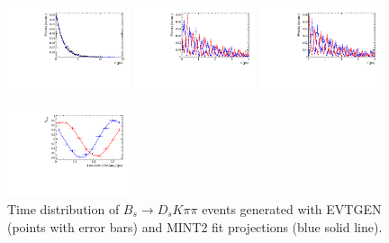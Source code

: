 \clearpage
\begin{figure}[h]
	\centering
		\includegraphics[width=0.32\textwidth, height = !]{figs/timeFit/signal_DsKpipi_CPV_MC/h_t.pdf} 
		\includegraphics[width=0.32\textwidth, height = !]{figs/timeFit/signal_DsKpipi_CPV_MC/h_t_mixed_m.pdf} 	
		\includegraphics[width=0.32\textwidth, height = !]{figs/timeFit/signal_DsKpipi_CPV_MC/h_t_mixed_p.pdf} 
		
		\includegraphics[width=0.32\textwidth, height = !]{figs/timeFit/signal_DsKpipi_CPV_MC/h_asym.pdf} 
		
		\caption{Time distribution of $B_s \to D_s K \pi\pi$ events generated with \textsf{EVTGEN} (points with error bars) and \textsf{MINT2} fit projections (blue solid line).} 	
		\label{fig:FitGenMC}	
\end{figure}	

